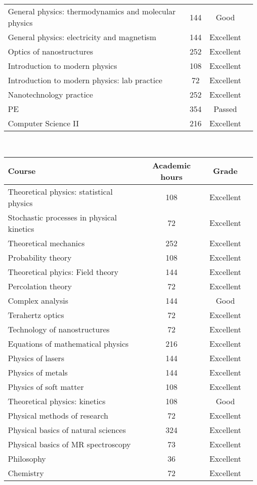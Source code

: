 \documentclass[11pt, a4paper]{report}
\begin{document}
\begin{tabular}{|p{6cm}|c|c|c|}
General physics: thermodynamics and molecular physics & 144 & Good \\
General physics: electricity and magnetism & 144 & Excellent \\
Optics of nanostructures & 252 & Excellent \\
Introduction to modern physics & 108 & Excellent \\
Introduction to modern physics: lab practice & 72 & Excellent \\
Nanotechnology practice & 252  & Excellent \\
PE & 354 & Passed \\
Computer Science II & 216  & Excellent \\
\hline
\end{tabular}
\\
\begin{tabular}{|p{6cm}|c|c|c|}
\hline
\textbf{Course}&\textbf{Academic hours} &\textbf{Grade}\\
\hline
Theoretical physics: statistical physics & 108 & Excellent \\
Stochastic processes in physical kinetics & 72  & Excellent \\
Theoretical mechanics & 252  & Excellent \\
Probability theory & 108  & Excellent \\
Theoretical phyics: Field theory & 144  & Excellent \\
Percolation theory & 72  & Excellent \\
Complex analysis & 144  & Good \\
Terahertz optics & 72  & Excellent \\
Technology of nanostructures & 72  & Excellent \\
Equations of mathematical physics & 216  & Excellent \\
Physics of lasers & 144  & Excellent \\
Physics of metals & 144  & Excellent \\
Physics of soft matter & 108  & Excellent \\
Theoretical physics: kinetics & 108 & Good \\
Physical methods of research & 72 & Excellent \\
Physical basics of natural sciences & 324 & Excellent \\
Physical basics of MR spectroscopy & 73 & Excellent \\
Philosophy & 36  & Excellent \\
Chemistry & 72  & Excellent \\

\end{tabular}
\end{document}
